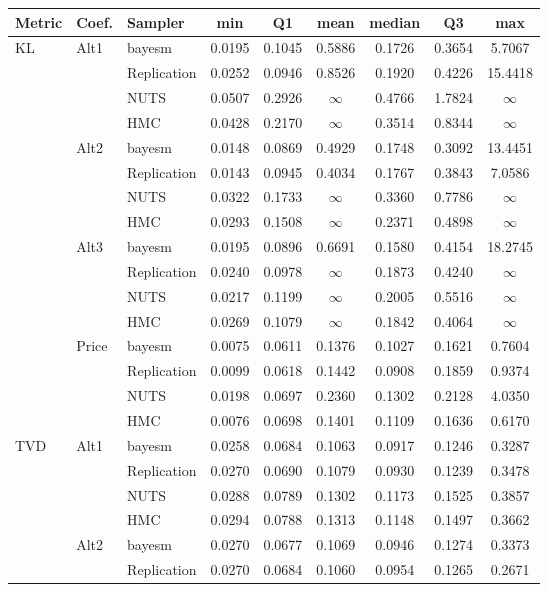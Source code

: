 \begin{tabular}{lllcccccc}
\toprule
Metric & Coef. & Sampler & min & Q1 & mean & median & Q3 & max \\
\midrule
KL & Alt1 & bayesm & 0.0195 & 0.1045 & 0.5886 & 0.1726 & 0.3654 & 5.7067 \\
 &  & Replication & 0.0252 & 0.0946 & 0.8526 & 0.1920 & 0.4226 & 15.4418 \\
 &  & NUTS & 0.0507 & 0.2926 & $\infty$ & 0.4766 & 1.7824 & $\infty$ \\
 &  & HMC & 0.0428 & 0.2170 & $\infty$ & 0.3514 & 0.8344 & $\infty$ \\
 & Alt2 & bayesm & 0.0148 & 0.0869 & 0.4929 & 0.1748 & 0.3092 & 13.4451 \\
 &  & Replication & 0.0143 & 0.0945 & 0.4034 & 0.1767 & 0.3843 & 7.0586 \\
 &  & NUTS & 0.0322 & 0.1733 & $\infty$ & 0.3360 & 0.7786 & $\infty$ \\
 &  & HMC & 0.0293 & 0.1508 & $\infty$ & 0.2371 & 0.4898 & $\infty$ \\
 & Alt3 & bayesm & 0.0195 & 0.0896 & 0.6691 & 0.1580 & 0.4154 & 18.2745 \\
 &  & Replication & 0.0240 & 0.0978 & $\infty$ & 0.1873 & 0.4240 & $\infty$ \\
 &  & NUTS & 0.0217 & 0.1199 & $\infty$ & 0.2005 & 0.5516 & $\infty$ \\
 &  & HMC & 0.0269 & 0.1079 & $\infty$ & 0.1842 & 0.4064 & $\infty$ \\
 & Price & bayesm & 0.0075 & 0.0611 & 0.1376 & 0.1027 & 0.1621 & 0.7604 \\
 &  & Replication & 0.0099 & 0.0618 & 0.1442 & 0.0908 & 0.1859 & 0.9374 \\
 &  & NUTS & 0.0198 & 0.0697 & 0.2360 & 0.1302 & 0.2128 & 4.0350 \\
 &  & HMC & 0.0076 & 0.0698 & 0.1401 & 0.1109 & 0.1636 & 0.6170 \\
TVD & Alt1 & bayesm & 0.0258 & 0.0684 & 0.1063 & 0.0917 & 0.1246 & 0.3287 \\
 &  & Replication & 0.0270 & 0.0690 & 0.1079 & 0.0930 & 0.1239 & 0.3478 \\
 &  & NUTS & 0.0288 & 0.0789 & 0.1302 & 0.1173 & 0.1525 & 0.3857 \\
 &  & HMC & 0.0294 & 0.0788 & 0.1313 & 0.1148 & 0.1497 & 0.3662 \\
 & Alt2 & bayesm & 0.0270 & 0.0677 & 0.1069 & 0.0946 & 0.1274 & 0.3373 \\
 &  & Replication & 0.0270 & 0.0684 & 0.1060 & 0.0954 & 0.1265 & 0.2671 \\

\end{tabular}
